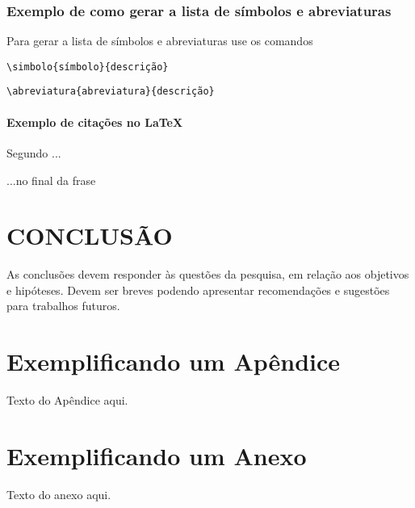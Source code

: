 \documentclass{ufscThesis} %
\begin{document}
\subsection{Exemplo de como gerar a lista de símbolos e abreviaturas}

Para gerar a lista de símbolos e abreviaturas use os comandos


\begin{lstlisting}
\simbolo{símbolo}{descrição}
\end{lstlisting}

\begin{lstlisting}
\abreviatura{abreviatura}{descrição}
\end{lstlisting}

\subsubsection{Exemplo de citações no \LaTeX}

Segundo  ...

...no final da frase \cite{abnt14724,BU_formatoA5}


\nocite{alves_2001,abnt10520,abnt6024,abnt14724}



\chapter{CONCLUSÃO}

As conclusões devem responder às questões da pesquisa, em relação aos objetivos e hipóteses. Devem ser breves podendo apresentar recomendações e sugestões para trabalhos futuros.




\apendice
\chapter{Exemplificando um Apêndice}
Texto do Apêndice aqui.

\anexo
\chapter{Exemplificando um Anexo}
Texto do anexo aqui.
\end{document}
